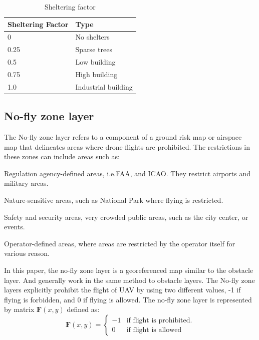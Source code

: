 \documentclass[12pt]{report}
\begin{document}
            \begin{table}[H]
                \centering
                \begin{tabular}{|p{4cm}|p{4cm}|}
                    Sheltering Factor & Type \\
                    \hline
                    0 & No shelters \\
                    \hline
                    0.25 & Sparse trees \\
                    \hline
                    0.5 & Low building \\
                    \hline
                    0.75 & High building \\
                    \hline
                    1.0 & Industrial building \\
                    \hline
                \end{tabular}
                \caption{Sheltering factor}
            \end{table}


        \subsection{No-fly zone layer}
            The No-fly zone layer refers to a component of a ground risk map or airspace map that delineates areas where
            drone flights are prohibited. The restrictions in these zones can include areas such as:
            \begin{myitemize}
                \item Regulation agency-defined areas, i.e.\ac{FAA}, and \ac{ICAO}. They restrict airports and military areas.
                \item Nature-sensitive areas, such as National Park where flying is restricted.
                \item Safety and security areas, very crowded public areas, such as the city center, or events.
                \item Operator-defined areas, where areas are restricted by the operator itself for various reason. 
            \end{myitemize}

            In this paper, the no-fly zone layer is a georeferenced map similar to the obstacle layer. And generally
            work in the same method to obstacle layers. The No-fly zone layers explicitly prohibit the flight of UAV by
            using two different values, -1 if flying is forbidden, and 0 if flying is allowed. The no-fly zone layer is
            represented by matrix \(\mathbf{F}(x, y)\) defined as:
            \begin{equation}
                \mathbf{F}(x, y) = 
                \begin{cases}    
                    -1 & \text{if flight is prohibited.} \\
                    0 & \text{if flight is allowed}
                \end{cases}
            \end{equation}
\end{document}

